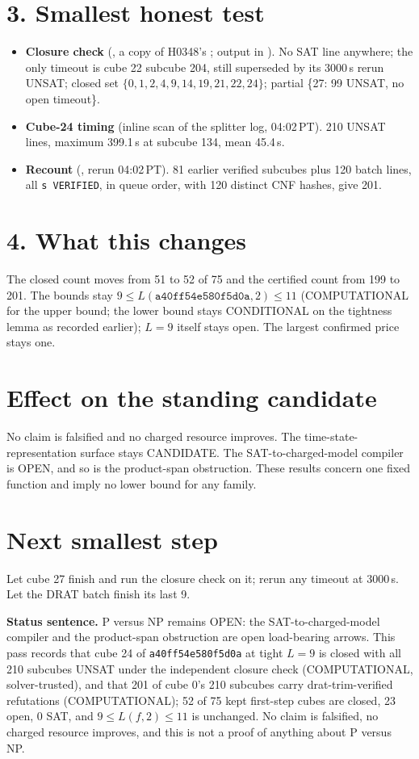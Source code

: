 \documentclass[11pt]{article}
\begin{document}
\section*{3. Smallest honest test}
\begin{itemize}
\item \textbf{Closure check} (, a copy of H0348's ; output in ). No SAT line anywhere; the only timeout is cube 22 subcube 204, still superseded by its 3000\,s rerun UNSAT; closed set $\{0,1,2,4,9,14,19,21,22,24\}$; partial \{27: 99 UNSAT, no open timeout\}.
\item \textbf{Cube-24 timing} (inline scan of the splitter log, 04:02\,PT). 210 UNSAT lines, maximum 399.1\,s at subcube 134, mean 45.4\,s.
\item \textbf{Recount} (, rerun 04:02\,PT). 81 earlier verified subcubes plus 120 batch lines, all \texttt{s VERIFIED}, in queue order, with 120 distinct CNF hashes, give 201.
\end{itemize}

\section*{4. What this changes}
The closed count moves from 51 to 52 of 75 and the certified count from 199 to 201. The bounds stay $9\le L(\texttt{a40ff54e580f5d0a},2)\le 11$ (COMPUTATIONAL for the upper bound; the lower bound stays CONDITIONAL on the tightness lemma as recorded earlier); $L=9$ itself stays open. The largest confirmed price stays one.

\section*{Effect on the standing candidate}
No claim is falsified and no charged resource improves. The time-state-representation surface stays CANDIDATE. The SAT-to-charged-model compiler is OPEN, and so is the product-span obstruction. These results concern one fixed function and imply no lower bound for any family.

\section*{Next smallest step}
Let cube 27 finish and run the closure check on it; rerun any timeout at 3000\,s. Let the DRAT batch finish its last 9.

\bigskip
\noindent\textbf{Status sentence.} P versus NP remains OPEN: the SAT-to-charged-model compiler and the product-span obstruction are open load-bearing arrows. This pass records that cube 24 of \texttt{a40ff54e580f5d0a} at tight $L=9$ is closed with all 210 subcubes UNSAT under the independent closure check (COMPUTATIONAL, solver-trusted), and that 201 of cube 0's 210 subcubes carry drat-trim-verified refutations (COMPUTATIONAL); 52 of 75 kept first-step cubes are closed, 23 open, 0 SAT, and $9\le L(f,2)\le 11$ is unchanged. No claim is falsified, no charged resource improves, and this is not a proof of anything about P versus NP.
\end{document}
